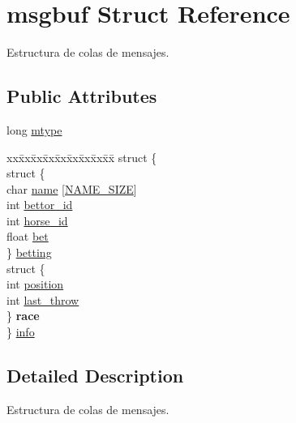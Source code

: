 \hypertarget{structmsgbuf}{}\section{msgbuf Struct Reference}
\label{structmsgbuf}


Estructura de colas de mensajes.  


\subsection*{Public Attributes}
\begin{DoxyCompactItemize}
\item 
long \hyperlink{structmsgbuf_a12a4780abaa96553f2ebf5fafeb58360}{mtype}
\item 
\begin{tabbing}
xx\=xx\=xx\=xx\=xx\=xx\=xx\=xx\=xx\=\kill
struct \{\\
\>struct \{\\
\>\>char \hyperlink{structmsgbuf_a72921f6ad2d6985d78d0e0fd1ae00774}{name} \mbox{[}\hyperlink{proyecto_8c_a834e9a379307f869a10f4da078be5786}{NAME\_SIZE}\mbox{]}\\
\>\>int \hyperlink{structmsgbuf_a4d6daa3e4bf410b275b596b1e6828110}{bettor\_id}\\
\>\>int \hyperlink{structmsgbuf_a2d569f43a4859884c21c9ce8f1408eeb}{horse\_id}\\
\>\>float \hyperlink{structmsgbuf_a39278db78542cbe8cf2df77ac5b8b080}{bet}\\
\>\} \hyperlink{structmsgbuf_a1337d4cd36a0fa762c15244c00853381}{betting}\\
\>struct \{\\
\>\>int \hyperlink{structmsgbuf_a0a654069b1868c3be58115550ed078fa}{position}\\
\>\>int \hyperlink{structmsgbuf_a2b1acedae627a698a89d2503665c593d}{last\_throw}\\
\>\} {\bfseries race}\\
\} \hyperlink{structmsgbuf_ad43d12674488c373d8fb69efed53c3cc}{info}\\

\end{tabbing}\end{DoxyCompactItemize}


\subsection{Detailed Description}
Estructura de colas de mensajes. 

